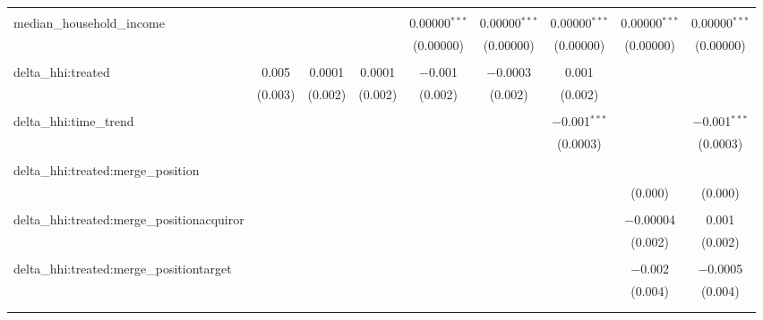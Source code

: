 \begin{table}[H]
{\begin{tabular}{@{\extracolsep{5pt}}lcccccccc}
   & & & & & & & & \\  

  median\_household\_income &  &  &  & 0.00000$^{***}$ & 0.00000$^{***}$ & 0.00000$^{***}$ & 0.00000$^{***}$ & 0.00000$^{***}$ \\  

   &  &  &  & (0.00000) & (0.00000) & (0.00000) & (0.00000) & (0.00000) \\  

   & & & & & & & & \\  

  delta\_hhi:treated & 0.005 & 0.0001 & 0.0001 & $-$0.001 & $-$0.0003 & 0.001 &  &  \\  

   & (0.003) & (0.002) & (0.002) & (0.002) & (0.002) & (0.002) &  &  \\  

   & & & & & & & & \\  

  delta\_hhi:time\_trend &  &  &  &  &  & $-$0.001$^{***}$ &  & $-$0.001$^{***}$ \\  

   &  &  &  &  &  & (0.0003) &  & (0.0003) \\  

   & & & & & & & & \\  

  delta\_hhi:treated:merge\_position &  &  &  &  &  &  &  &  \\  

   &  &  &  &  &  &  & (0.000) & (0.000) \\  

   & & & & & & & & \\  

  delta\_hhi:treated:merge\_positionacquiror &  &  &  &  &  &  & $-$0.00004 & 0.001 \\  

   &  &  &  &  &  &  & (0.002) & (0.002) \\  

   & & & & & & & & \\  

  delta\_hhi:treated:merge\_positiontarget &  &  &  &  &  &  & $-$0.002 & $-$0.0005 \\  

   &  &  &  &  &  &  & (0.004) & (0.004) \\  

   & & & & & & & & \\  

 \hline \\[-1.8ex]  


\end{tabular}}
\end{table}
